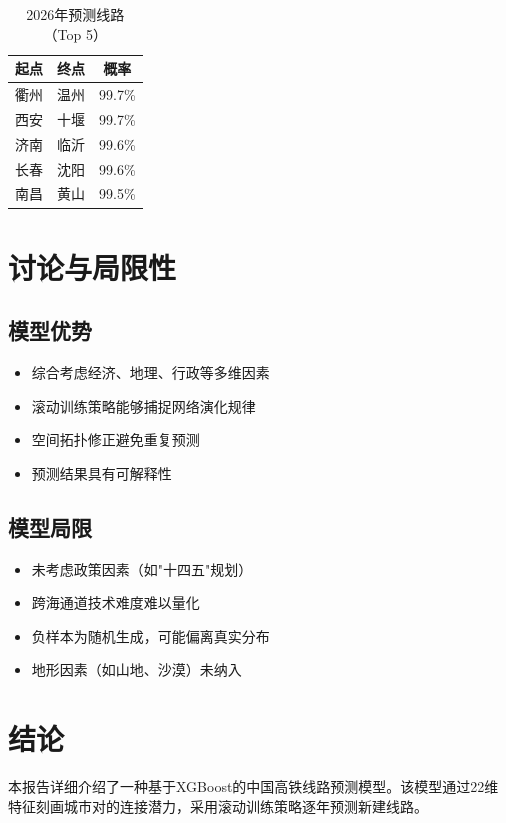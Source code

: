 \documentclass[12pt,a4paper]{article}
\begin{document}
\begin{table}[h]
\centering
\caption{2026年预测线路（Top 5）}
\begin{tabular}{llc}
\toprule
起点 & 终点 & 概率 \\
\midrule
衢州 & 温州 & 99.7\% \\
西安 & 十堰 & 99.7\% \\
济南 & 临沂 & 99.6\% \\
长春 & 沈阳 & 99.6\% \\
南昌 & 黄山 & 99.5\% \\
\bottomrule
\end{tabular}
\end{table}

\section{讨论与局限性}

\subsection{模型优势}
\begin{itemize}
    \item 综合考虑经济、地理、行政等多维因素
    \item 滚动训练策略能够捕捉网络演化规律
    \item 空间拓扑修正避免重复预测
    \item 预测结果具有可解释性
\end{itemize}

\subsection{模型局限}
\begin{itemize}
    \item 未考虑政策因素（如"十四五"规划）
    \item 跨海通道技术难度难以量化
    \item 负样本为随机生成，可能偏离真实分布
    \item 地形因素（如山地、沙漠）未纳入
\end{itemize}

\section{结论}

本报告详细介绍了一种基于XGBoost的中国高铁线路预测模型。该模型通过22维特征刻画城市对的连接潜力，采用滚动训练策略逐年预测新建线路。
\end{document}
